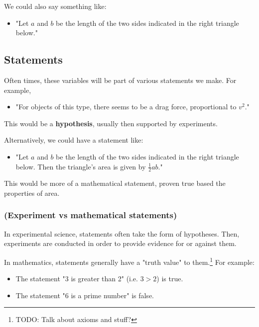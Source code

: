 \documentclass{book}
\begin{document}
We could also say something like:

\begin{itemize}
\item "Let $a$ and $b$ be the length of the two sides indicated in the right triangle below."
\end{itemize}



\subsection{Statements}

Often times, these variables will be part of various statements we make. For example, 
\begin{itemize}
\item "For objects of this type, there seems to be a drag force, proportional to $v^2$." 
\end{itemize}

This would be a \textbf{hypothesis}, usually then supported by experiments. 

Alternatively, we could have a statement like:

\begin{itemize}
\item "Let $a$ and $b$ be the length of the two sides indicated in the right triangle below. Then the triangle's area is given by $\frac{1}{2}ab$."
\end{itemize}

This would be more of a mathematical statement, proven true based the properties of area.

\subsubsection{(Experiment vs mathematical statements)}

In experimental science, statements often take the form of hypotheses. Then, experiments are conducted in order to provide evidence for or against them.

In mathematics, statements generally have a "truth value" to them.\footnote{TODO: Talk about axioms and stuff?} For example:

\begin{itemize}
\item The statement "3 is greater than 2" (i.e. $3 > 2$) is true. 
\item The statement "6 is a prime number" is false. 
\end{itemize}
\end{document}

